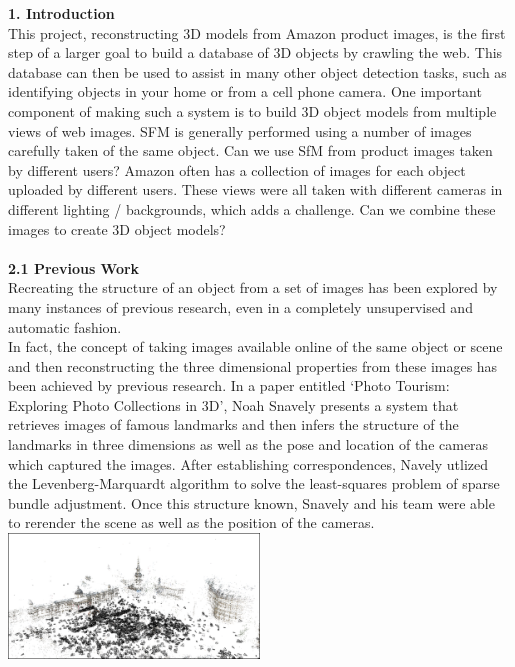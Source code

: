 \documentclass[12pt]{article}
\begin{document}
\begin{multicols}{2}
{\noindent \large \textbf{1. Introduction}}\\
This project, reconstructing 3D models from Amazon product images, is the first step of a larger goal to build a database of 3D objects by crawling the web.  This database can then be used to assist in many other object detection tasks, such as identifying objects in your home or from a cell phone camera.  One important component of making such a system is to build 3D object models from multiple views of web images. SFM is generally performed using a number of images carefully taken of the same object.  Can we use SfM from product images taken by different users?  Amazon often has a collection of images for each object uploaded by different users.  These views were all taken with different cameras in different lighting / backgrounds, which adds a challenge.  Can we combine these images to create 3D object models?
\\\\
{\large \textbf{2.1 Previous Work}}\\
Recreating the structure of an object from a set of images has been explored by many instances of previous research, even in a completely unsupervised and automatic fashion. \\
\indent In fact, the concept of taking images available online of the same object or scene and then reconstructing the three dimensional properties from these images has been achieved by previous research. In a paper entitled `Photo Tourism: Exploring Photo Collections in 3D', Noah Snavely presents a system that retrieves images of famous landmarks and then infers the structure of the landmarks in three dimensions as well as the pose and location of the cameras which captured the images. After establishing correspondences, Navely utlized the Levenberg-Marquardt algorithm to solve the least-squares problem of sparse bundle adjustment. Once this structure known, Snavely and his team were able to rerender the scene as well as the position of the cameras. \\
\includegraphics[width=0.5\textwidth]{images/phototourism.png}\\

\end{multicols}
\end{document}
